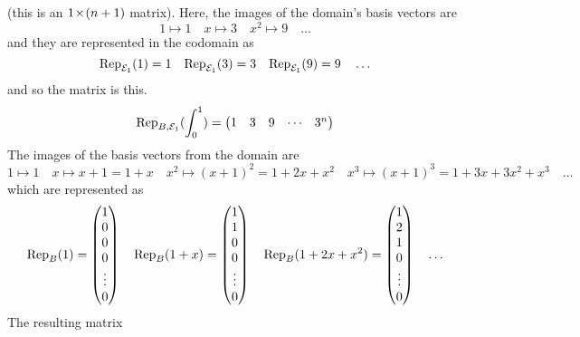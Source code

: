 \begin{exercises}
\begin{answer}
\begin{exparts}
          (this is an $\nbym{1}{(n+1)}$ matrix).
        \partsitem Here, the images of the domain's basis vectors are
          \begin{equation*}  
            1\mapsto 1 
            \quad x\mapsto 3 
            \quad x^2\mapsto 9
            \quad \ldots 
          \end{equation*}
          and they are represented in the codomain as
          \begin{equation*}
            \rep{1}{\stdbasis_1}=1
            \quad\rep{3}{\stdbasis_1}=3
            \quad\rep{9}{\stdbasis_1}=9
            \quad \ldots 
          \end{equation*}
          and so the matrix is this.
          \begin{equation*}
            \rep{\int_0^1}{B,\stdbasis_1}
            =\begin{pmatrix}
              1  &3   &9  &\cdots  &3^n
            \end{pmatrix}
          \end{equation*}
        \partsitem The images of the basis vectors from the domain are
          \begin{equation*} 
          1\mapsto 1 
          \quad x\mapsto x+1=1+x  
          \quad x^2\mapsto (x+1)^2=1+2x+x^2  
          \quad x^3\mapsto (x+1)^3=1+3x+3x^2+x^3  
          \quad \ldots 
          \end{equation*}
          which are represented as 
          \begin{equation*}
            \rep{1}{B}=\colvec{1 \\ 0 \\ 0 \\ 0 \\ \vdots \\ 0}
            \quad
            \rep{1+x}{B}=\colvec{1 \\ 1 \\ 0 \\ 0 \\ \vdots \\ 0}
            \quad
            \rep{1+2x+x^2}{B}=\colvec{1 \\ 2 \\ 1 \\ 0 \\ \vdots \\ 0}
            \quad\ldots
          \end{equation*}
          The resulting matrix
          \begin{equation*}
            \renewcommand{\arraystretch}{1.2}

\end{equation*}
\end{exparts}
\end{answer}
\end{exercises}
